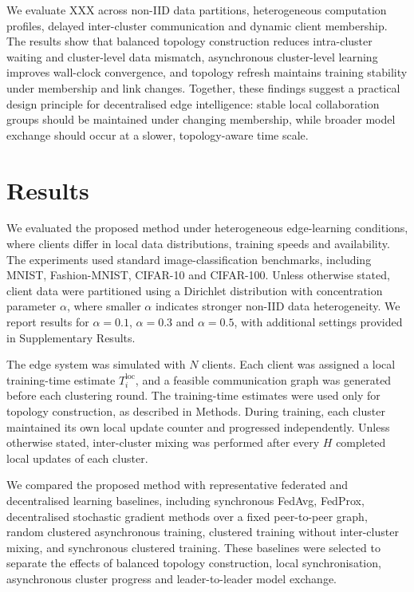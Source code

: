 \documentclass[pdflatex,sn-mathphys-num]{sn-jnl}
\begin{document}
We evaluate XXX across non-IID data partitions, heterogeneous computation profiles, delayed inter-cluster communication and dynamic client membership. The results show that balanced topology construction reduces intra-cluster waiting and cluster-level data mismatch, asynchronous cluster-level learning improves wall-clock convergence, and topology refresh maintains training stability under membership and link changes. Together, these findings suggest a practical design principle for decentralised edge intelligence: stable local collaboration groups should be maintained under changing membership, while broader model exchange should occur at a slower, topology-aware time scale.












\section{Results}
\label{sec:results}

We evaluated the proposed method under heterogeneous edge-learning conditions, where clients differ in local data distributions, training speeds and availability. The experiments used standard image-classification benchmarks, including MNIST, Fashion-MNIST, CIFAR-10 and CIFAR-100. Unless otherwise stated, client data were partitioned using a Dirichlet distribution with concentration parameter \(\alpha\), where smaller \(\alpha\) indicates stronger non-IID data heterogeneity. We report results for \(\alpha=0.1\), \(\alpha=0.3\) and \(\alpha=0.5\), with additional settings provided in Supplementary Results.

The edge system was simulated with \(N\) clients. Each client was assigned a local training-time estimate \(T_i^{\mathrm{loc}}\), and a feasible communication graph was generated before each clustering round. The training-time estimates were used only for topology construction, as described in Methods. During training, each cluster maintained its own local update counter and progressed independently. Unless otherwise stated, inter-cluster mixing was performed after every \(H\) completed local updates of each cluster.

We compared the proposed method with representative federated and decentralised learning baselines, including synchronous FedAvg, FedProx, decentralised stochastic gradient methods over a fixed peer-to-peer graph, random clustered asynchronous training, clustered training without inter-cluster mixing, and synchronous clustered training. These baselines were selected to separate the effects of balanced topology construction, local synchronisation, asynchronous cluster progress and leader-to-leader model exchange.
\end{document}
